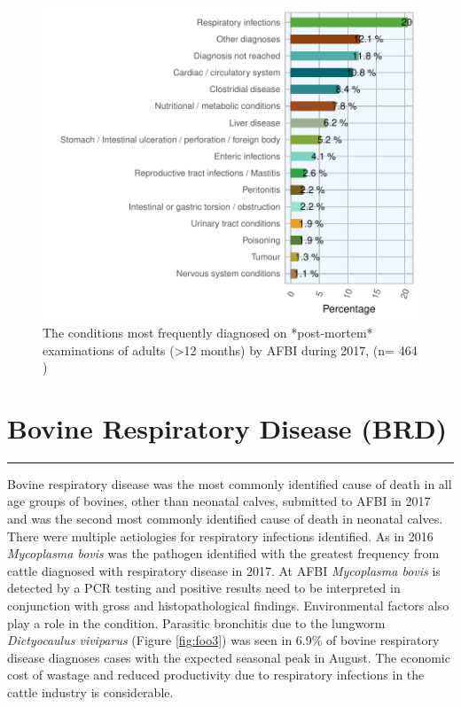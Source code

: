 \documentclass[]{book}
\begin{document}
\begin{figure}

{\centering \includegraphics{AFBI_files/figure-latex/unnamed-chunk-17-1} 

}

\caption{The conditions most frequently diagnosed on *post-mortem* examinations of  adults (>12 months) by AFBI during 2017, (n= 464 )}\label{fig:unnamed-chunk-17}
\end{figure}

\chapter{Bovine Respiratory Disease
(BRD)}\label{bovine-respiratory-disease-brd}

\begin{center}\rule{0.5\linewidth}{\linethickness}\end{center}

Bovine respiratory disease was the most commonly identified cause of
death in all age groups of bovines, other than neonatal calves,
submitted to AFBI in 2017 and was the second most commonly identified
cause of death in neonatal calves. There were multiple aetiologies for
respiratory infections identified. As in 2016 \emph{Mycoplasma bovis}
was the pathogen identified with the greatest frequency from cattle
diagnosed with respiratory disease in 2017. At AFBI \emph{Mycoplasma
bovis} is detected by a PCR testing and positive results need to be
interpreted in conjunction with gross and histopathological findings.
Environmental factors also play a role in the condition. Parasitic
bronchitis due to the lungworm \emph{Dictyocaulus viviparus} (Figure
\ref{fig:foo3}) was seen in 6.9\% of bovine respiratory disease
diagnoses cases with the expected seasonal peak in August. The economic
cost of wastage and reduced productivity due to respiratory infections
in the cattle industry is considerable.
\end{document}
